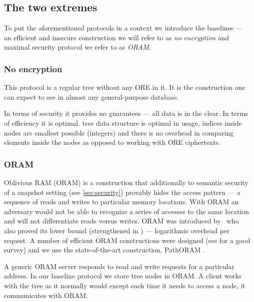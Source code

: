\subsection{The two extremes}

	To put the aforementioned protocols in a context we introduce the baselines --- an efficient and insecure construction we will refer to as \emph{no encryption} and maximal security protocol we refer to as \emph{ORAM}.

	\subsubsection{No encryption}

		This protocol is a regular {\BPlus} tree \cite{b-tree} without any ORE in it.
		It is the construction one can expect to see in almost any general-purpose database.

		In terms of security it provides no guarantees --- all data is in the clear.
		In terms of efficiency it is optimal.
		{\BPlus} tree data structure is optimal in {\IO} usage, indices inside nodes are smallest possible (integers) and there is no overhead in comparing elements inside the nodes as opposed to working with ORE ciphertexts.

	\subsubsection{ORAM}\label{sec:oram}

		Oblivious RAM (ORAM) is a construction that additionally to semantic security of a snapshot setting (see \cref{sec:security}) provably hides the access pattern --- a sequence of reads and writes to particular memory locations.
		With ORAM an adversary would not be able to recognize a series of accesses to the same location and will not differentiate reads versus writes.
		ORAM was introduced by~\textcite{oram-original} who also proved its lower bound (strengthened in \cite{oram-tighter-lower-bound}) --- logarithmic overhead per request.
		A number of efficient ORAM constructions were designed (see \cite{oram-survey-feifei} for a good survey) and we use the state-of-the-art construction, PathORAM \cite{path-oram}.

		A generic ORAM server responds to read and write requests for a particular address.
		In our baseline protocol we store {\BPlus} tree nodes in ORAM\@.
		A client works with the tree as it normally would except each time it needs to access a node, it communicates with ORAM\@.

